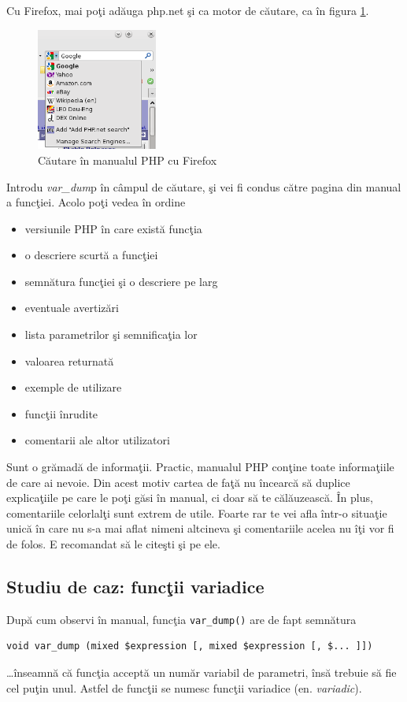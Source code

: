Cu Firefox, mai poţi adăuga php.net şi ca motor de căutare, ca în
figura \ref{fig:php.net search}.

\begin{figure}[h!]
  \centering
    \includegraphics[width=150px]{cap03/search.png}
  \caption{Căutare în manualul PHP cu Firefox}
  \label{fig:php.net search}
\end{figure}

Introdu \textit{var\_dum}p în câmpul de căutare, şi vei fi condus
către pagina din manual a funcţiei. Acolo poţi vedea
în ordine
\begin{itemize}
\item versiunile PHP în care există funcţia
\item o descriere scurtă a funcţiei
\item semnătura funcţiei şi o descriere pe larg
\item eventuale avertizări
\item lista parametrilor şi semnificaţia lor
\item valoarea returnată
\item exemple de utilizare
\item funcţii înrudite
\item comentarii ale altor utilizatori
\end{itemize}
Sunt o grămadă de informaţii. Practic, manualul
PHP conţine toate informaţiile de care ai nevoie.
Din acest motiv cartea de faţă nu încearcă să 
duplice explicaţiile pe care le poţi găsi în manual,
ci doar să te călăuzească. În plus, comentariile
celorlalţi sunt extrem de utile. Foarte rar te vei
afla într-o situaţie unică în care nu s-a mai aflat
nimeni altcineva şi comentariile acelea nu îţi vor fi de 
folos. E recomandat să le citeşti şi pe ele.


\subsection{Studiu de caz: funcţii variadice}
După cum observi în manual, funcţia \texttt{var\_dump()}
are de fapt semnătura
\begin{verbatim}
void var_dump (mixed $expression [, mixed $expression [, $... ]])
\end{verbatim}
\ldots înseamnă că funcţia acceptă un număr variabil
de parametri, însă trebuie să fie cel puţin unul.
Astfel de funcţii se numesc funcţii variadice (en. \textsl{variadic}).

